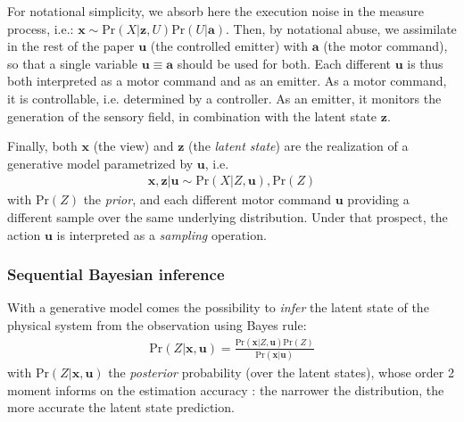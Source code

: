 \documentclass[12pt,twoside,openright]{article}
\begin{document}
For notational simplicity, we absorb here the execution noise \citep{van2004role} in the measure process, i.e.:
$\boldsymbol{x} \sim \text{Pr}(X|\boldsymbol{z}, U)\text{Pr}(U|\boldsymbol{a})$.
Then, by notational abuse, we assimilate in the rest of the paper  $\boldsymbol{u}$ (the controlled emitter) with $\boldsymbol{a}$ (the motor command), so that 
a single variable $\boldsymbol{u} \equiv \boldsymbol{a}$ should be used for both. %
Each different $\boldsymbol{u}$ is thus both interpreted as a
motor command and as {\color{Purple} an emitter}. As a motor command, it is controllable, i.e. determined by a controller. As {\color{Purple} an emitter}, it monitors the generation of the sensory field, in combination with the latent state $\boldsymbol{z}$. 

Finally, both $\boldsymbol{x}$ (the view) and $\boldsymbol{z}$ (the \emph{latent state}) are the realization of a generative model parametrized by $\boldsymbol{u}$, i.e.
\begin{align}
\boldsymbol{x}, \boldsymbol{z} | \boldsymbol{u} \sim \text{Pr}(X|Z, \boldsymbol{u}), \text{Pr}(Z) \label{eq:generative}
\end{align}  
with $\text{Pr}(Z)$ the \emph{prior}, and each different motor command $\boldsymbol{u}$ providing a different sample over the same underlying distribution. Under that prospect, the action $\boldsymbol{u}$ is interpreted as a \emph{sampling} operation.

\subsubsection{Sequential Bayesian inference}\label{sec:seq-bayes}


With a generative model comes the possibility to \emph{infer} the latent state of the physical system {\color{Purple} from the observation}
using Bayes rule:
\begin{align}
\text{Pr}(Z|\boldsymbol{x},\boldsymbol{u})
= \frac{\text{Pr}(\boldsymbol{x}|Z, \boldsymbol{u}) \text{Pr}(Z)}
{\text{Pr}(\boldsymbol{x}|\boldsymbol{u})}\label{eq:post-Pr}
\end{align}
with $\text{Pr}(Z|\boldsymbol{x},\boldsymbol{u})$ the \emph{posterior} probability
(over the latent states), whose order 2 moment informs on the estimation accuracy : the narrower the distribution, the more accurate the latent state prediction. 
\end{document}
